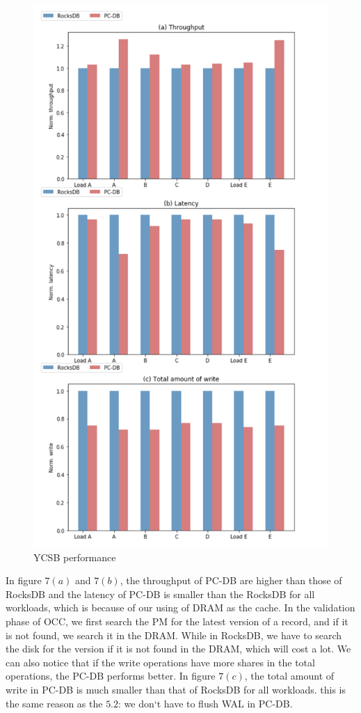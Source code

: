 \begin{figure}
    \centering
    \includegraphics[width=0.36\paperwidth]{figure/YCSB performance.png}
    \caption{YCSB performance }
    \label{fig:YCSB}
\end{figure}
In figure $7(a)$ and $7(b)$, the throughput of PC-DB are higher than those of RocksDB and the latency of PC-DB is smaller than the RocksDB for all workloads, which is because of our using of DRAM as the cache. In the validation phase of OCC, we first search the PM for the latest version of a record, and if it is not found, we search it in the DRAM. While in RocksDB, we have to search the disk for the version if it is not found in the DRAM, which will cost a lot. We can also notice that if the write operations have more shares in the total operations, the PC-DB performs better.
In figure $7(c)$, the total amount of write in PC-DB is much smaller than that of RocksDB for all workloads. this is the same reason as the $5.2$: we don`t have to flush WAL in PC-DB.